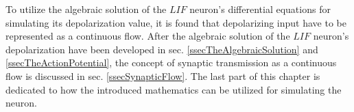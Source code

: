 \documentclass[b5paper,12 pt]{report}
\begin{document}
To utilize the algebraic solution of the $LIF$ neuron's differential equations for simulating its depolarization value, it is found that depolarizing input have to be represented as a continuous flow.
After the algebraic solution of the $LIF$ neuron's depolarization have been developed in sec.  \ref{ssecTheAlgebraicSolution} and \ref{ssecTheActionPotential},
	the concept of synaptic transmission as a continuous flow is discussed in sec. \ref{ssecSynapticFlow}.
The last part of this chapter is dedicated to how the introduced mathematics can be utilized for simulating the neuron. 

	
	








\end{document}
